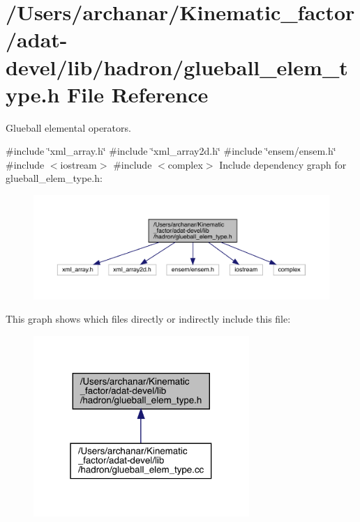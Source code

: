 \hypertarget{adat-devel_2lib_2hadron_2glueball__elem__type_8h}{}\section{/\+Users/archanar/\+Kinematic\+\_\+factor/adat-\/devel/lib/hadron/glueball\+\_\+elem\+\_\+type.h File Reference}
\label{adat-devel_2lib_2hadron_2glueball__elem__type_8h}


Glueball elemental operators.  


{\ttfamily \#include \char`\"{}xml\+\_\+array.\+h\char`\"{}}\newline
{\ttfamily \#include \char`\"{}xml\+\_\+array2d.\+h\char`\"{}}\newline
{\ttfamily \#include \char`\"{}ensem/ensem.\+h\char`\"{}}\newline
{\ttfamily \#include $<$iostream$>$}\newline
{\ttfamily \#include $<$complex$>$}\newline
Include dependency graph for glueball\+\_\+elem\+\_\+type.\+h\+:
\nopagebreak
\begin{figure}[H]
\begin{center}
\leavevmode
\includegraphics[width=350pt]{d5/d42/adat-devel_2lib_2hadron_2glueball__elem__type_8h__incl}
\end{center}
\end{figure}
This graph shows which files directly or indirectly include this file\+:
\nopagebreak
\begin{figure}[H]
\begin{center}
\leavevmode
\includegraphics[width=232pt]{db/d01/adat-devel_2lib_2hadron_2glueball__elem__type_8h__dep__incl}
\end{center}
\end{figure}
